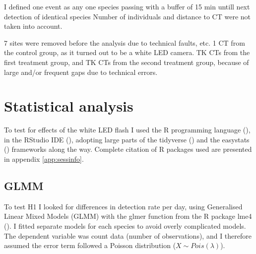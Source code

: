 I defined one event as any one species passing with a buffer of 15 min untill next detection of identical species %
Number of individuals and distance to CT were not taken into account. 

7 sites were removed before the analysis due to technical faults, etc. %
1 CT from the control group, as it turned out to be a white LED camera.%
TK CTs from the first treatment group, and TK CTs from the second treatment group, because of large and/or frequent gaps due to technical errors. 


%
%
%
%
%


\section{Statistical analysis} %

To test for effects of the white LED flash I used the R programming language (\cite{RCoreTeam2020}), in the RStudio IDE (\cite{RStudioTeam2020a}), adopting large parts of the tidyverse (\cite{tidyverse}) and the easystats (\cite{easystats}) frameworks along the way. Complete citation of R packages used are presented in appendix \ref{app:sessinfo}. %


	\subsection*{GLMM}
To test H1 I looked for differences in detection rate per day, using Generalised Linear Mixed Models (GLMM) with the glmer function from the R package lme4 (\cite{lme4}).
I fitted separate models for each species to avoid overly complicated models. 
The dependent variable was count data (number of observations), and I therefore assumed the error term followed a Poisson distribution ($ X \sim Pois(\lambda) $).

